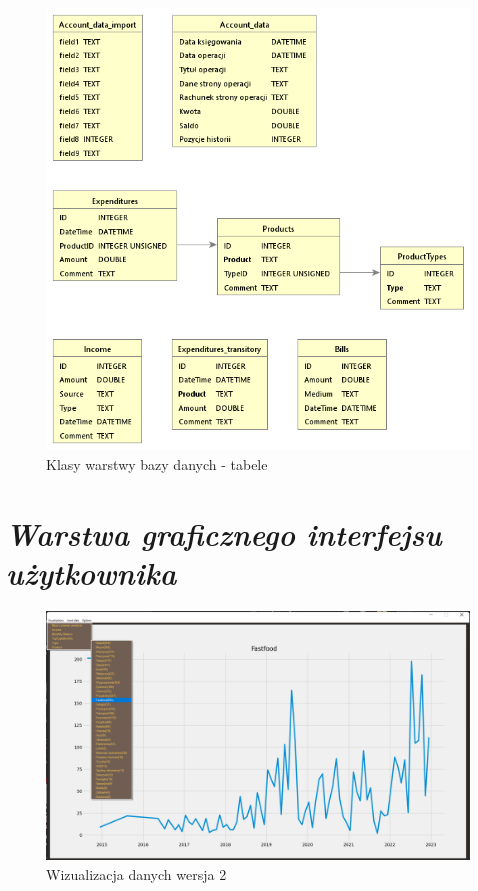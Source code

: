 \documentclass[a4paper,10pt]{report}
\newcommand{\customstylesection}[1]{\textbf{\textit{#1}}}
\begin{document}
\begin{figure}[H]           %
    \caption{Klasy warstwy bazy danych - tabele}
    \label{fig:Klasy warstwy bazy danych - tabele}
    \centering  
    \includegraphics[width=12cm]{figures/Budgeter_Finances-db_Tables.png}
\end{figure}

\section{\customstylesection{Warstwa graficznego interfejsu użytkownika}}

\begin{figure}[H]           %
    \caption{Wizualizacja danych wersja 2}
    \label{fig:Wizualizacja danych wersja 2}
    \centering  
    \includegraphics[width=12cm]{figures/Interface_v0.2.png}
\end{figure}
\end{document}
